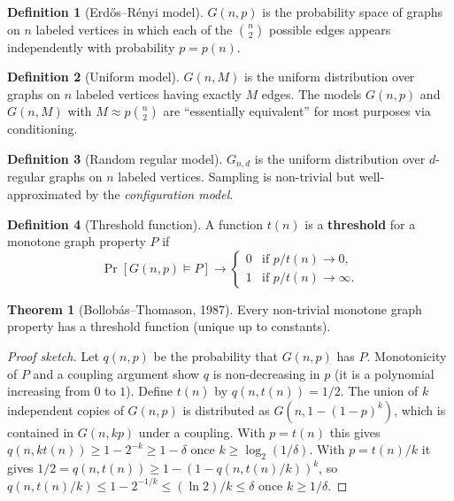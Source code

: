 \documentclass{article}
\theoremstyle{definition}
\newtheorem{theorem}{Theorem}
\newtheorem{definition}{Definition}
\begin{document}
\begin{definition}[Erd\H{o}s--R\'enyi model]\label{def:gnp}
$G(n, p)$ is the probability space of graphs on $n$ labeled vertices
in which each of the $\binom{n}{2}$ possible edges appears
independently with probability $p = p(n)$.
\end{definition}

\begin{definition}[Uniform model]
$G(n, M)$ is the uniform distribution over graphs on $n$ labeled
vertices having exactly $M$ edges. The models $G(n, p)$ and
$G(n, M)$ with $M \approx p\binom{n}{2}$ are ``essentially equivalent''
for most purposes via conditioning.
\end{definition}

\begin{definition}[Random regular model]
$G_{n, d}$ is the uniform distribution over $d$-regular graphs on
$n$ labeled vertices. Sampling is non-trivial but well-approximated
by the \emph{configuration model}.
\end{definition}

\begin{definition}[Threshold function]
A function $t(n)$ is a \textbf{threshold} for a monotone graph
property $P$ if
\[
  \Pr[G(n, p) \models P] \to
  \begin{cases} 0 & \text{if } p/t(n) \to 0, \\
                1 & \text{if } p/t(n) \to \infty. \end{cases}
\]
\end{definition}

\begin{theorem}[Bollob\'as--Thomason, 1987]\label{thm:bt}
Every non-trivial monotone graph property has a threshold function
(unique up to constants).
\end{theorem}

\begin{proof}[Proof sketch]
Let $q(n, p)$ be the probability that $G(n, p)$ has $P$. Monotonicity
of $P$ and a coupling argument show $q$ is non-decreasing in $p$
(it is a polynomial increasing from $0$ to $1$).
Define $t(n)$ by $q(n, t(n)) = 1/2$. The union of $k$ independent copies
of $G(n, p)$ is distributed as $G(n, 1 - (1 - p)^k)$, which is contained in
$G(n, kp)$ under a coupling. With $p = t(n)$ this gives
$q(n, k t(n)) \ge 1 - 2^{-k} \ge 1 - \delta$ once $k \ge \log_2(1/\delta)$.
With $p = t(n)/k$ it gives $1/2 = q(n, t(n)) \ge 1 - (1 - q(n, t(n)/k))^k$,
so $q(n, t(n)/k) \le 1 - 2^{-1/k} \le (\ln 2)/k \le \delta$ once $k \ge 1/\delta$.
\end{proof}
\end{document}
